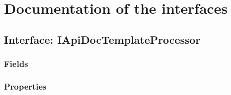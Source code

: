 \documentclass[11pt, oneside, a4paper]{book}
\begin{document}
\chapter{Documentation of the interfaces}

\hypertarget{SoftwareEngineeringTools.{}Documentation.{}IApiDocTemplateProcessor}{}
\section{Interface: IApiDocTemplateProcessor}

\subsection{Fields}

\subsection{Properties}
\end{document}
